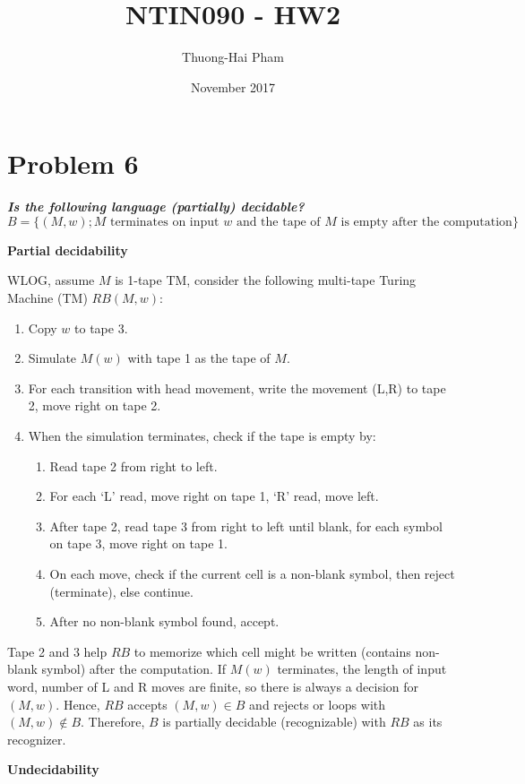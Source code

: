 \documentclass{article}
\title{NTIN090 - HW2}
\author{Thuong-Hai Pham}
\date{November 2017}
\begin{document}
\maketitle

\section{Problem 6}
\textbf{\textit{Is the following language (partially) decidable?}}
\[B=\{(M, w); M \text{ terminates on input } w \text{ and the tape of } M \text{ is empty after the computation}\}\]

\textbf{Partial decidability}

WLOG, assume $M$ is 1-tape TM, consider the following multi-tape Turing Machine (TM) $RB(M,w)$:
\begin{enumerate}
    \item Copy $w$ to tape 3.
    \item Simulate $M(w)$  with tape 1 as the tape of $M$.
    \item For each transition with head movement, write the movement (L,R) to tape 2, move right on tape 2.
    \item When the simulation terminates, check if the tape is empty by:
        \begin{enumerate}
            \item Read tape 2 from right to left.
            \item For each `L' read, move right on tape 1, `R' read, move left.
            \item After tape 2, read tape 3 from right to left until blank, for each symbol on tape 3, move right on tape 1.
            \item On each move, check if the current cell is a non-blank symbol, then reject (terminate), else continue.
            \item After no non-blank symbol found, accept.
        \end{enumerate}
\end{enumerate}

Tape 2 and 3 help $RB$ to memorize which cell might be written (contains non-blank symbol) after the computation. If $M(w)$ terminates, the length of input word, number of L and R moves are finite, so there is always a decision for $(M,w)$. Hence, $RB$ accepts $(M,w)\in B$ and rejects or loops with $(M,w)\notin B$. Therefore, $B$ is partially decidable (recognizable) with $RB$ as its recognizer.

\bigskip
\textbf{Undecidability}
\end{document}
